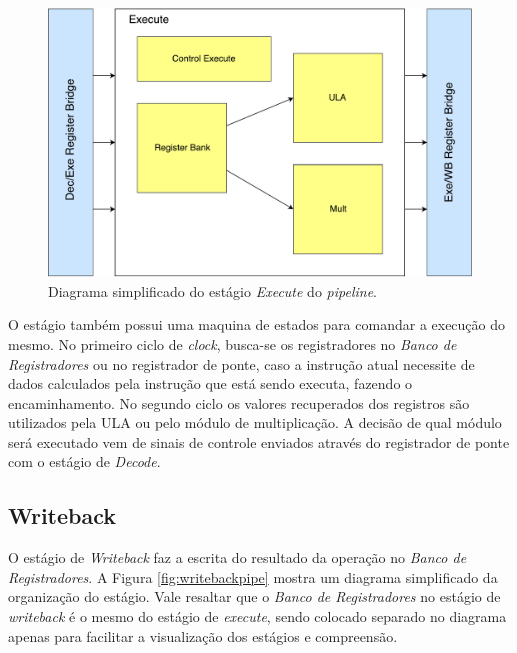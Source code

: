 \documentclass[11pt,a4paper,titlepage]{article}
\begin{document}
\begin{figure}[!h]
\centering
\includegraphics[scale=0.4]{images/executepipe.pdf}
\caption{Diagrama simplificado do estágio \textit{Execute} do \textit{pipeline}.}
\label{fig:executepipe}
\end{figure}

O estágio também possui uma maquina de estados para comandar a execução do mesmo. No primeiro ciclo de \textit{clock}, busca-se os registradores no \textit{Banco de Registradores} ou no registrador de ponte, caso a instrução atual necessite de dados calculados pela instrução que está sendo executa, fazendo o encaminhamento. No segundo ciclo os valores recuperados dos registros são utilizados pela ULA ou pelo módulo de multiplicação. A decisão de qual módulo será executado vem de sinais de controle enviados através do registrador de ponte com o estágio de \textit{Decode}.

\subsection{Writeback}

O estágio de \textit{Writeback} faz a escrita do resultado da operação no \textit{Banco de Registradores}. A Figura \ref{fig:writebackpipe} mostra um diagrama simplificado da organização do estágio. Vale resaltar que o \textit{Banco de Registradores} no estágio de \textit{writeback} é o mesmo do estágio de \textit{execute}, sendo colocado separado no diagrama apenas para facilitar a visualização dos estágios e compreensão.
\end{document}
